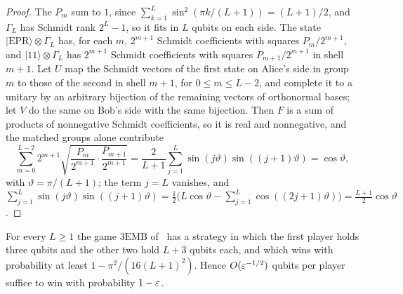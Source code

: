 \begin{proof}
The $P_m$ sum to $1$, since $\sum_{k=1}^L\sin^2(\pi k/(L+1))=(L+1)/2$, and $\Gamma_L$ has Schmidt rank $2^L-1$, so it fits in $L$
qubits on each side. The state $|\mathrm{EPR}\rangle\otimes\Gamma_L$ has, for each $m$, $2^{m+1}$ Schmidt coefficients with squares
$P_m/2^{m+1}$, and $|11\rangle\otimes\Gamma_L$ has $2^{m+1}$ Schmidt coefficients with squares $P_{m+1}/2^{m+1}$ in shell $m+1$. Let $U$
map the Schmidt vectors of the first state on Alice's side in group $m$ to those of the second in shell $m+1$, for
$0\le m\le L-2$, and complete it to a unitary by an arbitrary bijection of the remaining vectors of orthonormal bases;
let $V$ do the same on Bob's side with the same bijection. Then $F$ is a sum of products of nonnegative Schmidt
coefficients, so it is real and nonnegative, and the matched groups alone contribute
\[
\sum_{m=0}^{L-2}2^{m+1}\sqrt{\frac{P_m}{2^{m+1}}\cdot\frac{P_{m+1}}{2^{m+1}}}=\frac2{L+1}\sum_{j=1}^L\sin(j\vartheta)\sin((j+1)\vartheta)=\cos\vartheta,
\]
with $\vartheta=\pi/(L+1)$; the term $j=L$ vanishes, and
$\sum_{j=1}^L\sin(j\vartheta)\sin((j+1)\vartheta)=\frac12\bigl(L\cos\vartheta-\sum_{j=1}^L\cos((2j+1)\vartheta)\bigr)=\frac{L+1}2\cos\vartheta$.
\end{proof}

\begin{proposition}\label{prop:jlv}
For every $L\ge1$ the game $\mathrm{3EMB}$ of~\cite[Figure~2]{JLV20} has a strategy in which the first player holds three
qubits and the other two hold $L+3$ qubits each, and which wins with probability at least $1-\pi^2/(16(L+1)^2)$. Hence
$O(\varepsilon^{-1/2})$ qubits per player suffice to win with probability $1-\varepsilon$.
\end{proposition}

